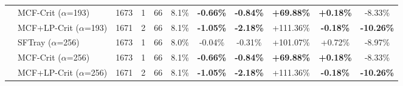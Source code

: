 \begin{table}[t]
{\begin{tabular}{ll|cccc|ccc|cc}
 & MCF-Crit ($\alpha$=193) & 1673 & 1 & 66 & 8.1\% & \textbf{-0.66\%} & \textbf{-0.84\%} & \textbf{+69.88\%} & \textbf{+0.18\%} & -8.33\% \\

 & MCF+LP-Crit ($\alpha$=193) & 1671 & 2 & 66 & 8.1\% & \textbf{-1.05\%} & \textbf{-2.18\%} & +111.36\% & \textbf{-0.18\%} & \textbf{-10.26\%} \\

\addlinespace[0.5em]

 & SFTray ($\alpha$=256) & 1673 & 1 & 66 & 8.0\% & -0.04\% & -0.31\% & +101.07\% & +0.72\% & -8.97\% \\

 & MCF-Crit ($\alpha$=256) & 1673 & 1 & 66 & 8.1\% & \textbf{-0.66\%} & \textbf{-0.84\%} & \textbf{+69.88\%} & \textbf{+0.18\%} & -8.33\% \\

 & MCF+LP-Crit ($\alpha$=256) & 1671 & 2 & 66 & 8.1\% & \textbf{-1.05\%} & \textbf{-2.18\%} & +111.36\% & \textbf{-0.18\%} & \textbf{-10.26\%} \\

\midrule

\bottomrule

\end{tabular}

}

\end{table}

